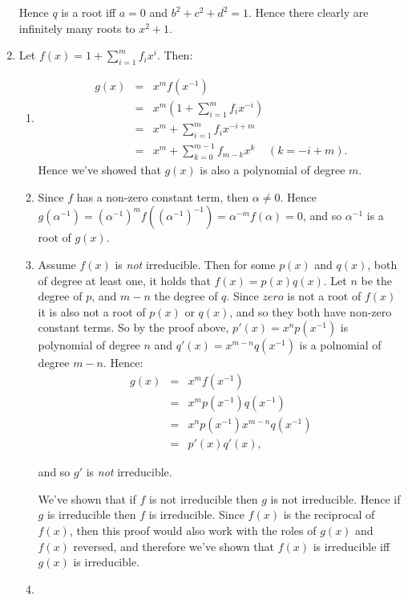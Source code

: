 \documentclass[11pt]{article} \usepackage{amssymb}
\begin{document}
\begin{enumerate}
  Hence $q$ is a root iff $a=0$ and $b^2+c^2+d^2=1$. Hence there clearly are
  infinitely many roots to $x^2+1$.

\item
  Let $f(x)=1+\sum_{i=1}^mf_ix^i$. Then:
  \begin{enumerate}
  \item 
    \begin{eqnarray*}
      g(x)&=&x^mf(x^{-1})
      \\ &=& x^m\left(1+\sum_{i=1}^mf_ix^{-i}\right)
      \\ &=& x^m+\sum_{i=1}^mf_ix^{-i+m}
      \\ &=& x^m+\sum_{k=0}^{m-1}f_{m-k}x^k \;\;\;\; (k=-i+m).
    \end{eqnarray*}
    Hence we've showed that $g(x)$ is also a polynomial of degree $m$.

  \item
    Since $f$ has a non-zero constant term, then $\alpha\neq 0$. Hence
    $g(\alpha^{-1})=(\alpha^{-1})^mf((\alpha^{-1})^{-1})=\alpha^{-m}f(\alpha)=0$, and so
    $\alpha^{-1}$ is a root of $g(x)$.

  \item

    Assume $f(x)$ is {\em not} irreducible. Then for some $p(x)$ and $q(x)$, 
    both of degree at least one, it holds
    that $f(x)=p(x)q(x)$. Let $n$ be the degree of $p$, and $m-n$ the degree of 
    $q$. Since $zero$ is not a root of $f(x)$ it is also not a root of $p(x)$
    or $q(x)$, and so they both have non-zero constant terms. So by
    the proof above, $p'(x)=x^np(x^{-1})$ is polynomial of degree $n$ and 
    $q'(x)=x^{m-n}q(x^{-1})$ is a polnomial of degree $m-n$. Hence:
    \begin{eqnarray*}
      g(x)&=& x^mf(x^{-1})
      \\ &=& x^mp(x^{-1})q(x^{-1})
      \\ &=& x^np(x^{-1})x^{m-n}q(x^{-1})
      \\ &=& p'(x)q'(x),
    \end{eqnarray*}

    and so $g'$ is {\em not} irreducible. 

    We've shown that if $f$ is not irreducible then $g$ is not irreducible. 
    Hence if $g$ is irreducible then $f$ is irreducible. Since $f(x)$ is
    the reciprocal of $f(x)$, then this proof would also work with the roles
    of $g(x)$ and $f(x)$ reversed, and therefore we've shown that $f(x)$
    is irreducible iff $g(x)$ is irreducible.

  \item
    
    
  
  \end{enumerate}
\end{enumerate}
\end{document}
